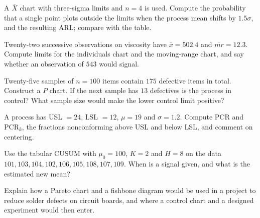 \begin{exercise}
A $\bar{X}$ chart with three-sigma limits and $n=4$ is used. Compute the probability that a single point plots outside the limits when the process mean shifts by $1.5\sigma$, and the resulting ARL; compare with the table.
\end{exercise}

\begin{exercise}
Twenty-two successive observations on viscosity have $\bar{x}=502.4$ and $\overline{mr}=12.3$. Compute limits for the individuals chart and the moving-range chart, and say whether an observation of $543$ would signal.
\end{exercise}

\begin{exercise}
Twenty-five samples of $n=100$ items contain $175$ defective items in total. Construct a $P$ chart. If the next sample has $13$ defectives is the process in control? What sample size would make the lower control limit positive?
\end{exercise}

\begin{exercise}
A process has USL $=24$, LSL $=12$, $\mu=19$ and $\sigma=1.2$. Compute PCR and PCR$_k$, the fractions nonconforming above USL and below LSL, and comment on centering.
\end{exercise}

\begin{exercise}
Use the tabular CUSUM with $\mu_0=100$, $K=2$ and $H=8$ on the data $101,103,104,102,106,105,108,107,109$. When is a signal given, and what is the estimated new mean?
\end{exercise}

\begin{exercise}
Explain how a Pareto chart and a fishbone diagram would be used in a project to reduce solder defects on circuit boards, and where a control chart and a designed experiment would then enter.
\end{exercise}
